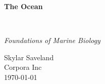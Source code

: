 \clearpage
\vspace*{1.5in}
\begin{center}
  \begin{minipage}{\textwidth}
    \centering
    \Huge\bfseries
    \linespread{1.25}\selectfont
  The Ocean
  \end{minipage}
  \\[3em]
  {\Large\itshape\linespread{1.3}\selectfont
  Foundations of Marine Biology\par}
  \vfill
  {\large Skylar Saveland}
  \\[1em]
  {\large Corpora Inc}
  \\[1em]
  {\large \today}
\end{center}
\clearpage
